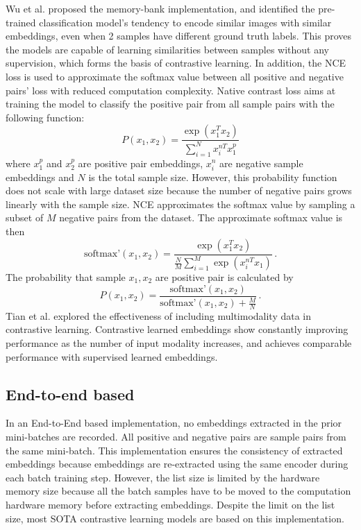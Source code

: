 \documentclass[12pt,twoside]{report}
\begin{document}
Wu et al.\cite{instdisc} proposed the memory-bank implementation, and identified the pre-trained classification model's tendency to encode similar images with similar embeddings, even when 2 samples have different ground truth labels. This proves the models are capable of learning similarities between samples without any supervision, which forms the basis of contrastive learning. In addition, the NCE loss is used to approximate the softmax value between all positive and negative pairs' loss with reduced computation complexity. Native contrast loss aims at training the model to classify the positive pair from all sample pairs with the following function: $$ P(x_1, x_2) = \frac{\exp(x_1^T x_2)}{\sum_{i = 1}^{N} x^{nT}_i x^p_1} $$ where $x^p_1$ and $x^p_2$ are positive pair embeddings, $x^n_i$ are negative sample embeddings and $N$ is the total sample size. However, this probability function does not scale with large dataset size because the number of negative pairs grows linearly with the sample size. NCE approximates the softmax value by sampling a subset of $M$ negative pairs from the dataset. The approximate softmax value is then $$ \text{softmax'}(x_1, x_2) = \frac{\exp(x_1^T x_2)}{\frac{N}{M}\sum_{i = 1}^{M} \exp(x^{nT}_i x_1)} \,.$$The probability that sample $x_1, x_2$ are positive pair is calculated by $$ P(x_1, x_2) = \frac{\text{softmax'}(x_1, x_2)}{\text{softmax'}(x_1, x_2) + \frac{M}{N}}\,.$$Tian et al.\cite{cmc} explored the effectiveness of including multimodality data in contrastive learning. Contrastive learned embeddings show constantly improving performance as the number of input modality increases, and achieves comparable performance with supervised learned embeddings. 

\subsection{End-to-end based}
In an End-to-End based implementation, no embeddings extracted in the prior mini-batches are recorded. All positive and negative pairs are sample pairs from the same mini-batch. This implementation ensures the consistency of extracted embeddings because embeddings are re-extracted using the same encoder during each batch training step. However, the list size is limited by the hardware memory size because all the batch samples have to be moved to the computation hardware memory before extracting embeddings. Despite the limit on the list size, most SOTA contrastive learning models are based on this implementation. \\
\end{document}
